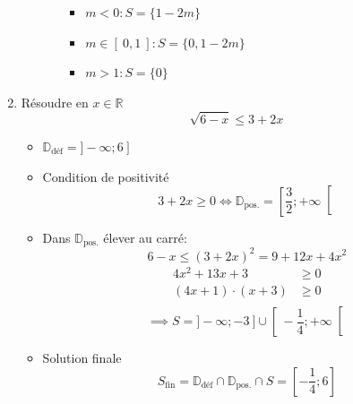 \documentclass[
    11pt,
    a4paper,
    oneside,
    headinlcude, footinclude,
    twoside,
]{report}
\begin{document}
\begin{enumerate}
\begin{itemize}
\begin{itemize}
                    \begin{center}
                        \begin{minipage}{.5\linewidth}
                            \resizebox{\textwidth}{!}{
                            }
                        \end{minipage}
                        \begin{minipage}{.49\linewidth}
                            \setlength{\parskip}{.3em}
                            \begin{itemize}
                                \item $m < 0 : S = \{1-2m\}$
                                \item $m \in [\ 0, 1\ ] : S = \{0, 1-2m\}$
                                \item $m > 1 : S = \{0\}$
                            \end{itemize}
                        \end{minipage}
                    \end{center}
            \end{itemize}
        \end{itemize}

    \item Résoudre en $x \in \mathbb{R}$
        $$\sqrt{6 - x} \leq  3 + 2x$$

        \begin{itemize}
            \item $\mathbb{D}_{\text{déf}} = ]-\infty; 6\ ]$
            \item Condition de positivité $$3 + 2x \geq 0 \iff \mathbb{D}_{\text{pos.}}
                = \left[\frac{3}{2}; + \infty\right[$$
            \item Dans $\mathbb{D}_{\text{pos.}}$ élever au carré:
                $$6 -x \leq (3 + 2x)^{2} = 9 + 12 x + 4 x^{2}$$
                \[
                    \begin{split}
                        4x^{2} + 13 x + 3 & \geq 0\\
                        (4x + 1) \cdot (x +3) &\geq 0\\
                    \end{split}
                \]
                $$\implies S = ]-\infty; -3\ ] \cup \left[\ - \frac{1}{4};  + \infty\right[$$

            \item  Solution finale
                $$S_{\text{fin}} = \mathbb{D}_{\text{déf}} \cap
                \mathbb{D}_{\text{pos.}} \cap S = \left[-\frac{1}{4}; 6\right]$$
        \end{itemize}


\end{enumerate}
\end{document}
